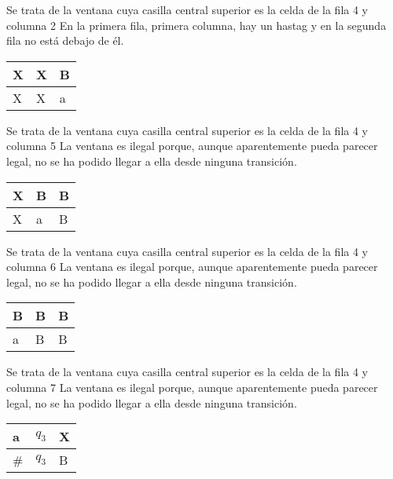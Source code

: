 ﻿\documentclass[a4paper,10pt]{article}
\begin{document}
Se trata de la ventana cuya casilla central superior es la celda de la fila 4 y columna 2\newline
En la primera fila, primera columna, hay un hastag y en la segunda fila no está debajo de él.\newline
\begin{table}[h!]
\centering
\begin{tabular}{|l|l|l|}
\hline
	X   &   X   &   B	\\ \hline
	X   &   X   &   a	\\ \hline
\end{tabular}
\end{table}

Se trata de la ventana cuya casilla central superior es la celda de la fila 4 y columna 5\newline
La ventana es ilegal porque, aunque aparentemente pueda parecer legal, no se ha podido llegar a ella desde ninguna transición.\newline
\begin{table}[h!]
\centering
\begin{tabular}{|l|l|l|}
\hline
	X   &   B   &   B	\\ \hline
	X   &   a   &   B	\\ \hline
\end{tabular}
\end{table}

Se trata de la ventana cuya casilla central superior es la celda de la fila 4 y columna 6\newline
La ventana es ilegal porque, aunque aparentemente pueda parecer legal, no se ha podido llegar a ella desde ninguna transición.\newline
\begin{table}[h!]
\centering
\begin{tabular}{|l|l|l|}
\hline
	B   &   B   &   B	\\ \hline
	a   &   B   &   B	\\ \hline
\end{tabular}
\end{table}

Se trata de la ventana cuya casilla central superior es la celda de la fila 4 y columna 7\newline
La ventana es ilegal porque, aunque aparentemente pueda parecer legal, no se ha podido llegar a ella desde ninguna transición.\newline
\begin{table}[h!]
\centering
\begin{tabular}{|l|l|l|}
\hline
	a   &   $q_3$  &   X	\\ \hline
	\#  &   $q_3$  &   B	\\ \hline
\end{tabular}
\end{table}
\end{document}
